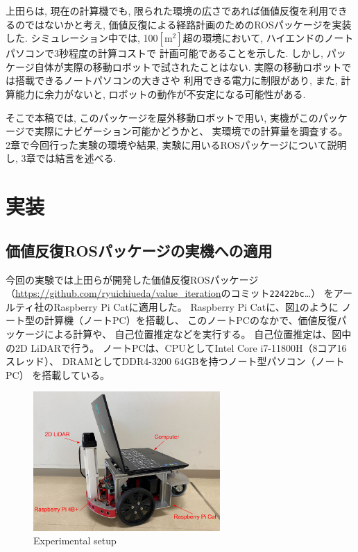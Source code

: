 \documentclass{jarticle}
\begin{document}
上田らは, 現在の計算機でも,
限られた環境の広さであれば価値反復を利用できるのではないかと考え,
価値反復による経路計画のためのROSパッケージを実装した\cite{上田rsj2021}.
シミュレーション中では, 100$\mathrm{[m^2]}$超の環境において,
ハイエンドのノートパソコンで3秒程度の計算コストで
計画可能であることを示した.
しかし, パッケージ自体が実際の移動ロボットで試されたことはない.
実際の移動ロボットでは搭載できるノートパソコンの大きさや
利用できる電力に制限があり,
また, 計算能力に余力がないと, ロボットの動作が不安定になる可能性がある.


そこで本稿では, このパッケージを屋外移動ロボットで用い,
実機がこのパッケージで実際にナビゲーション可能かどうかと、
実環境での計算量を調査する。
2章で今回行った実験の環境や結果, 実験に用いるROSパッケージについて説明し, 
3章では結言を述べる.

\section{実装}%

\subsection{価値反復ROSパッケージの実機への適用}

今回の実験では上田らが開発した価値反復ROSパッケージ
（\url{https://github.com/ryuichiueda/value_iteration}のコミット\texttt{22422bc}\dots）
\cite{上田rsj2021}をアールティ社のRaspberry Pi Catに適用した。
Raspberry Pi Catに、図\ref{fig:raspicat}のように
ノート型の計算機（ノートPC）を搭載し、
このノートPCのなかで、価値反復パッケージによる計算や、
自己位置推定などを実行する。
自己位置推定は、図中の2D LiDARで行う。
ノートPCは、CPUとしてIntel Core i7-11800H（8コア16スレッド）、
DRAMとしてDDR4-3200 64GBを持つノート型パソコン（ノートPC）
を搭載している。

\begin{figure}[htb]
  \centering
   \includegraphics[height=53mm]{./figs/raspicat.png}
   \caption{Experimental setup}
	\label{fig:raspicat}
\end{figure}
\end{document}
